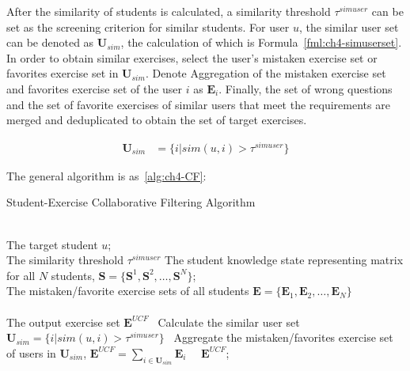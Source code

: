 After the similarity of students is calculated, a similarity threshold \(\tau^{simuser}\) can be set as the screening criterion for similar students. For user \(u\), the similar user set can be denoted as \(\mathbf{U}_{sim}\), the calculation of which is Formula~\ref{fml:ch4-simuserset}. In order to obtain similar exercises, select the user's mistaken exercise set or favorites exercise set in \(\mathbf{U}_{sim}\). Denote Aggregation of the mistaken exercise set and favorites exercise set of the user \(i\) as \(\mathbf{E}_{i}\). Finally, the set of wrong questions and the set of favorite exercises of similar users that meet the requirements are merged and deduplicated to obtain the set of target exercises.

\begin{align}
  \mathbf{U}_{sim} & =\{i|sim(u,i)>\tau^{simuser}\}  \label{fml:ch4-simuserset}
\end{align}

The general algorithm is as~\ref{alg:ch4-CF}:
\begin{algorithm}[h]
  \caption{Student-Exercise Collaborative Filtering Algorithm}\label{alg:ch4-CF}
  \begin{algorithmic}
    \REQUIRE~~\\
    The target student \(u\); \\
    The similarity threshold \(\tau^{simuser}\)
    The student knowledge state representing matrix for all \(N\) students, \(\mathbf{S}=\{\mathbf{S}^1,\mathbf{S}^2,\ldots,\mathbf{S}^N\} \);\\
    The mistaken/favorite exercise sets of all students \( \mathbf{E}=\{\mathbf{E}_1,\mathbf{E}_2,\ldots,\mathbf{E}_N\} \) \\
    \ENSURE~~\\ %
    The output exercise set \(\mathbf{E}^{UCF} \)
    \STATE~Calculate the similar user set \(\mathbf{U}_{sim}=\{i|sim(u,i)>\tau^{simuser}\}  \)
    \STATE~Aggregate the mistaken/favorites exercise set of users in \(\mathbf{U}_{sim}\), \(\mathbf{E}^{UCF}=\sum\limits_{i \in \mathbf{U}_{sim}}{\mathbf{E}_{i}}\)
    \RETURN~~\(\mathbf{E}^{UCF} \); %
  \end{algorithmic}
\end{algorithm}





